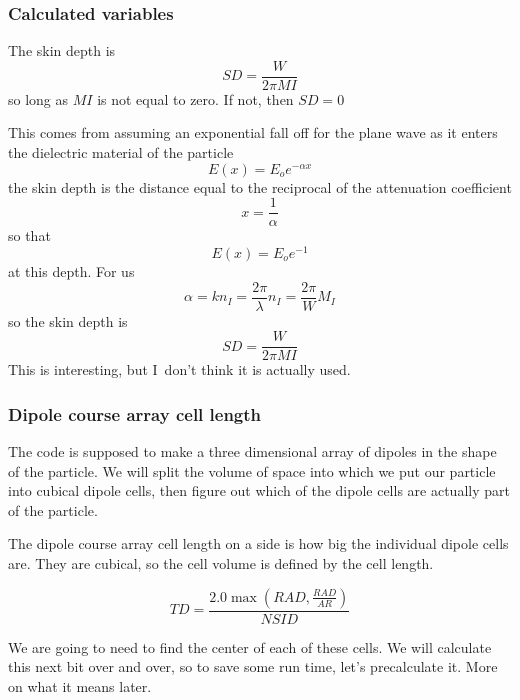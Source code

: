 \documentclass{article}
\begin{document}
\subsubsection{Calculated variables}

The skin depth is 
\[
SD=\frac{W}{2\pi MI} 
\]%
so long as $MI$ is not equal to zero. If not, then $SD=0$

This comes from assuming an exponential fall off for the plane wave as it
enters the dielectric material of the particle 
\[
E\left( x\right) =E_{o}e^{-\alpha x} 
\]%
the skin depth is the distance equal to the reciprocal of the attenuation
coefficient%
\[
x=\frac{1}{\alpha } 
\]%
so that 
\[
E\left( x\right) =E_{o}e^{-1} 
\]%
at this depth. For us 
\[
\alpha =kn_{I}=\frac{2\pi }{\lambda }n_{I}=\frac{2\pi }{W}M_{I} 
\]%
so the skin depth is 
\[
SD=\frac{W}{2\pi MI} 
\]%
This is interesting, but I\ don't think it is actually used.

\subsubsection{Dipole course array cell length}

The code is supposed to make a three dimensional array of dipoles in the
shape of the particle. We will split the volume of space into which we put
our particle into cubical dipole cells, then figure out which of the dipole
cells are actually part of the particle. 

The dipole course array cell length on a side is how big the individual
dipole cells are. They are cubical, so the cell
volume is defined by the cell length.

\[
TD=\frac{2.0\max \left( RAD,\frac{RAD}{AR}\right) }{NSID} 
\]

We are going to need to find the center of each of these cells. We will
calculate this next bit over and over, so to save some run time, let's
precalculate it. More on what it means later.
\end{document}
